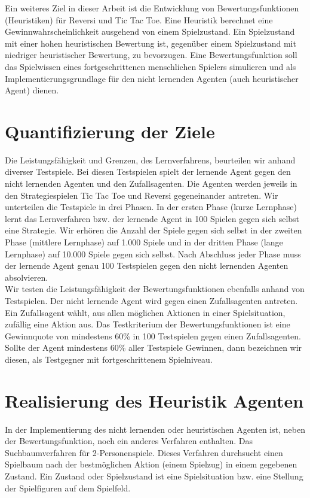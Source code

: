 Ein weiteres Ziel in dieser Arbeit ist die Entwicklung von Bewertungsfunktionen (Heuristiken) für Reversi und Tic Tac Toe. Eine Heuristik berechnet eine Gewinnwahrscheinlichkeit ausgehend von einem Spielzustand. Ein Spielzustand mit einer hohen heuristischen Bewertung ist, gegenüber einem Spielzustand mit niedriger heuristischer Bewertung, zu bevorzugen. Eine Bewertungsfunktion soll das Spielwissen eines fortgeschrittenen menschlichen Spielers simulieren und als Implementierungsgrundlage für den nicht lernenden Agenten (auch heuristischer Agent) dienen.\\

\section{Quantifizierung der Ziele}
\label{sec:Quantifizierung der Ziele}
Die Leistungsfähigkeit und Grenzen, des Lernverfahrens, beurteilen wir anhand diverser Testspiele. Bei diesen Testspielen spielt der lernende Agent gegen den nicht lernenden Agenten und den Zufallsagenten. Die Agenten werden jeweils in den Strategiespielen Tic Tac Toe und Reversi gegeneinander antreten. Wir unterteilen die Testspiele in drei Phasen. In der ersten Phase (kurze Lernphase) lernt das Lernverfahren bzw. der lernende Agent in 100 Spielen gegen sich selbst eine Strategie. Wir erhören die Anzahl der Spiele gegen sich selbst in der zweiten Phase (mittlere Lernphase) auf 1.000 Spiele und in der dritten Phase (lange Lernphase) auf 10.000 Spiele gegen sich selbst. Nach Abschluss jeder Phase muss der lernende Agent genau 100 Testspielen gegen den nicht lernenden Agenten absolvieren. \\

Wir testen die Leistungsfähigkeit der Bewertungsfunktionen ebenfalls anhand von Testspielen. Der nicht lernende Agent wird gegen einen Zufallsagenten antreten. Ein Zufallsagent wählt, aus allen möglichen Aktionen in einer Spielsituation, zufällig eine Aktion aus. Das Testkriterium der Bewertungsfunktionen ist eine Gewinnquote von mindestens 60\% in 100 Testspielen gegen einen Zufallsagenten. Sollte der Agent mindestens 60\% aller Testspiele Gewinnen, dann bezeichnen wir diesen, als Testgegner mit fortgeschrittenem Spielniveau. \\

\section{Realisierung des Heuristik Agenten}
In der Implementierung des nicht lernenden oder heuristischen Agenten ist, neben der Bewertungsfunktion, noch ein anderes Verfahren enthalten. Das Suchbaumverfahren für 2-Personenspiele. Dieses Verfahren durchsucht einen Spielbaum nach der bestmöglichen Aktion (einem Spielzug) in einem gegebenen Zustand. Ein Zustand oder Spielzustand ist eine Spielsituation bzw. eine Stellung der Spielfiguren auf dem Spielfeld. \\

